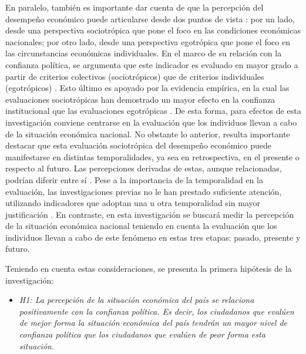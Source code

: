 \documentclass[12pt,twoside]{templates/facsothesis}
\providecommand{\tightlist}{%
  \setlength{\itemsep}{0pt}\setlength{\parskip}{0pt}}
\begin{document}
En paralelo, también es importante dar cuenta de que la percepción del desempeño económico puede articularse desde dos puntos de vista \citep{vandermeerEconomicPerformancePolitical2018}: por un lado, desde una perspectiva sociotrópica que pone el foco en las condiciones económicas nacionales; por otro lado, desde una perspectiva egotrópica que pone el foco en las circunstancias económicas individuales. En el marco de su relación con la confianza política, se argumenta que este indicador es evaluado en mayor grado a partir de criterios colectivos (sociotrópicos) que de criterios individuales (egotrópicos) \citep{mcallisterEconomicPerformanceGovernments1999}. Esto último es apoyado por la evidencia empírica, en la cual las evaluaciones sociotrópicas han demostrado un mayor efecto en la confianza institucional que las evaluaciones egotrópicas \citep{mainwaringStateDeficienciesParty2006, torcalDeclinePoliticalTrust2014a, torcalResponsivenessPerformanceCorruption2021, vandermeerEconomicPerformancePolitical2018}. De esta forma, para efectos de esta investigación conviene centrarse en la evaluación que los individuos llevan a cabo de la situación económica nacional. No obstante lo anterior, resulta importante destacar que esta evaluación sociotrópica del desempeño económico puede manifestarse en distintas temporalidades, ya sea en retrospectiva, en el presente o respecto al futuro. Las percepciones derivadas de estas, aunque relacionadas, podrían diferir entre sí \citep{torcalResponsivenessPerformanceCorruption2021}. Pese a la importancia de la temporalidad en la evaluación, las investigaciones previas no le han prestado suficiente atención, utilizando indicadores que adoptan una u otra temporalidad sin mayor justificación \citep{mainwaringStateDeficienciesParty2006, leeEconomicPerformanceIncome2020, oskarssonGeneralizedTrustPolitical2010}. En contraste, en esta investigación se buscará medir la percepción de la situación económica nacional teniendo en cuenta la evaluación que los individuos llevan a cabo de este fenómeno en estas tres etapas: pasado, presente y futuro.

Teniendo en cuenta estas consideraciones, se presenta la primera hipótesis de la investigación:

\begin{itemize}
\tightlist
\item
  \emph{H1: La percepción de la situación económica del país se relaciona positivamente con la confianza política. Es decir, los ciudadanos que evalúen de mejor forma la situación económica del país tendrán un mayor nivel de confianza política que los ciudadanos que evalúen de peor forma esta situación.}
\end{itemize}
\end{document}
